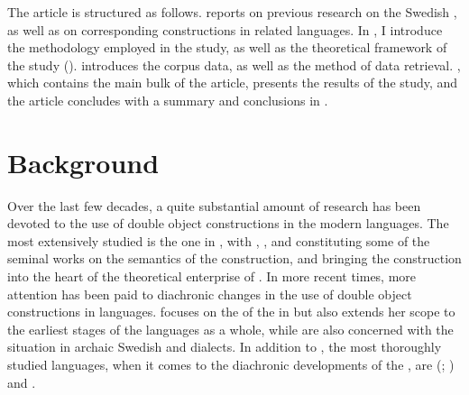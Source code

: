 \documentclass[output=paper]{langscibook}
\begin{document}
The article is structured as follows.  reports on previous research on the Swedish , as well as on corresponding constructions in related languages. In , I introduce the methodology employed in the study, as well as the theoretical framework of the study ().  introduces the corpus data, as well as the method of data retrieval. , which contains the main bulk of the article, presents the results of the study, and the article concludes with a summary and conclusions in .


\section{Background}\label{sec:valdeson:2}


Over the last few decades, a quite substantial amount of research has been devoted to the use of double object constructions in the modern  languages. The most extensively studied  is the one in , with \citet{Green1974}, \citet{Wierzbicka1988}, and \citet{Pinker1989} constituting some of the seminal works on the semantics of the construction, and \citet{Goldberg1995} bringing the construction into the heart of the theoretical enterprise of . In more recent times, more attention has been paid to diachronic changes in the use of double object constructions in  languages. \textcite{Bardal2007} focuses on the  of the  in  but also extends her scope to the earliest stages of the  languages as a whole, while \textcite{Bardal2011} are also concerned with the situation in archaic Swedish and  dialects. In addition to , the most thoroughly studied languages, when it comes to the diachronic developments of the , are  (\citealt{CollemanDe_Clerck2008, CollemanDe_Clerck2011, CollemanDe_Clerck2008}; \citealt{Zehentner2018}) and  \citep{Colleman2011}.
\end{document}
